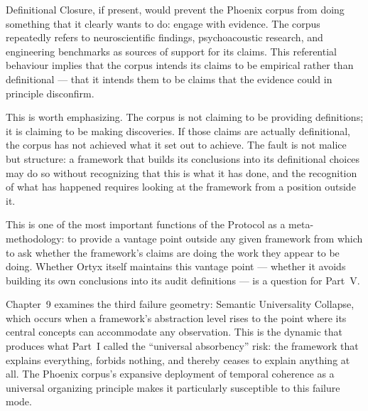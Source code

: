 Definitional Closure, if present, would prevent the Phoenix
corpus from doing something that it clearly wants to do:
engage with evidence. The corpus repeatedly refers to
neuroscientific findings, psychoacoustic research, and
engineering benchmarks as sources of support for its claims.
This referential behaviour implies that the corpus intends
its claims to be empirical rather than definitional ---
that it intends them to be claims that the evidence could
in principle disconfirm.

This is worth emphasizing. The corpus is not claiming to
be providing definitions; it is claiming to be making
discoveries. If those claims are actually definitional,
the corpus has not achieved what it set out to achieve.
The fault is not malice but structure: a framework that
builds its conclusions into its definitional choices may
do so without recognizing that this is what it has done,
and the recognition of what has happened requires looking
at the framework from a position outside it.

This is one of the most important functions of the \Ortyx{}
Protocol as a meta-methodology: to provide a vantage point
outside any given framework from which to ask whether
the framework's claims are doing the work they appear to
be doing. Whether Ortyx itself maintains this vantage point
--- whether it avoids building its own conclusions into
its audit definitions --- is a question for Part~V.

\medskip

Chapter~9 examines the third failure geometry: Semantic
Universality Collapse, which occurs when a framework's
abstraction level rises to the point where its central
concepts can accommodate any observation. This is
the dynamic that produces what Part~I called the
``universal absorbency'' risk: the framework that
explains everything, forbids nothing, and thereby ceases
to explain anything at all. The Phoenix corpus's expansive
deployment of temporal coherence as a universal organizing
principle makes it particularly susceptible to this failure
mode.
